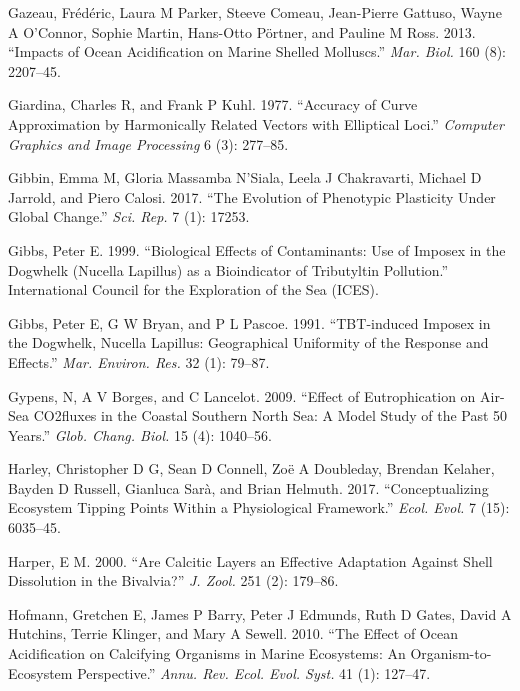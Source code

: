\documentclass[smallextended]{svjour3}       %
\newlength{\cslhangindent}
\newenvironment{CSLReferences}[2] %
 {%
  \setlength{\parindent}{0pt}
  \ifodd #1 \everypar{\setlength{\hangindent}{\cslhangindent}}\ignorespaces\fi
  \ifnum #2 > 0
  \setlength{\parskip}{#2\baselineskip}
  \fi
 }%
 {}
\begin{document}
\begin{CSLReferences}{1}{0}
\leavevmode{}%
Gazeau, Frédéric, Laura M Parker, Steeve Comeau, Jean-Pierre Gattuso,
Wayne A O'Connor, Sophie Martin, Hans-Otto Pörtner, and Pauline M Ross.
2013. {``Impacts of Ocean Acidification on Marine Shelled Molluscs.''}
\emph{Mar. Biol.} 160 (8): 2207--45.

\leavevmode{}%
Giardina, Charles R, and Frank P Kuhl. 1977. {``Accuracy of Curve
Approximation by Harmonically Related Vectors with Elliptical Loci.''}
\emph{Computer Graphics and Image Processing} 6 (3): 277--85.

\leavevmode{}%
Gibbin, Emma M, Gloria Massamba N'Siala, Leela J Chakravarti, Michael D
Jarrold, and Piero Calosi. 2017. {``The Evolution of Phenotypic
Plasticity Under Global Change.''} \emph{Sci. Rep.} 7 (1): 17253.

\leavevmode{}%
Gibbs, Peter E. 1999. {``Biological Effects of Contaminants: Use of
Imposex in the Dogwhelk (Nucella Lapillus) as a Bioindicator of
Tributyltin Pollution.''} International Council for the Exploration of
the Sea (ICES).

\leavevmode{}%
Gibbs, Peter E, G W Bryan, and P L Pascoe. 1991. {``{TBT-induced}
Imposex in the Dogwhelk, Nucella Lapillus: Geographical Uniformity of
the Response and Effects.''} \emph{Mar. Environ. Res.} 32 (1): 79--87.

\leavevmode{}%
Gypens, N, A V Borges, and C Lancelot. 2009. {``Effect of Eutrophication
on Air-Sea {CO2fluxes} in the Coastal Southern North Sea: A Model Study
of the Past 50 Years.''} \emph{Glob. Chang. Biol.} 15 (4): 1040--56.

\leavevmode{}%
Harley, Christopher D G, Sean D Connell, Zoë A Doubleday, Brendan
Kelaher, Bayden D Russell, Gianluca Sarà, and Brian Helmuth. 2017.
{``Conceptualizing Ecosystem Tipping Points Within a Physiological
Framework.''} \emph{Ecol. Evol.} 7 (15): 6035--45.

\leavevmode{}%
Harper, E M. 2000. {``Are Calcitic Layers an Effective Adaptation
Against Shell Dissolution in the Bivalvia?''} \emph{J. Zool.} 251 (2):
179--86.

\leavevmode{}%
Hofmann, Gretchen E, James P Barry, Peter J Edmunds, Ruth D Gates, David
A Hutchins, Terrie Klinger, and Mary A Sewell. 2010. {``The Effect of
Ocean Acidification on Calcifying Organisms in Marine Ecosystems: An
{Organism-to-Ecosystem} Perspective.''} \emph{Annu. Rev. Ecol. Evol.
Syst.} 41 (1): 127--47.


\end{CSLReferences}
\end{document}
